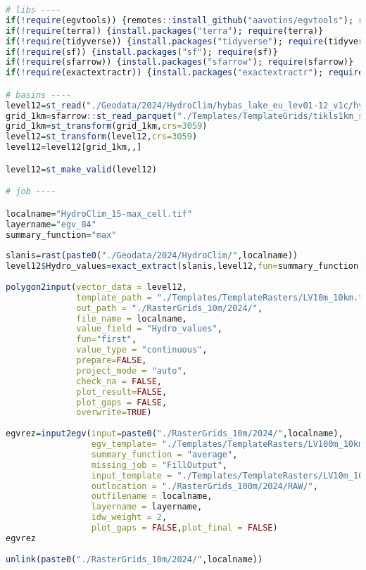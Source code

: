 \documentclass[
]{book}
\begin{document}
\begin{lstlisting}[language=R]
# libs ----
if(!require(egvtools)) {remotes::install_github("aavotins/egvtools"); require(egvtools)}
if(!require(terra)) {install.packages("terra"); require(terra)}
if(!require(tidyverse)) {install.packages("tidyverse"); require(tidyverse)}
if(!require(sf)) {install.packages("sf"); require(sf)}
if(!require(sfarrow)) {install.packages("sfarrow"); require(sfarrow)}
if(!require(exactextractr)) {install.packages("exactextractr"); require(exactextractr)}

# basins ----
level12=st_read("./Geodata/2024/HydroClim/hybas_lake_eu_lev01-12_v1c/hybas_lake_eu_lev12_v1c.shp")
grid_1km=sfarrow::st_read_parquet("./Templates/TemplateGrids/tikls1km_sauzeme.parquet")
grid_1km=st_transform(grid_1km,crs=3059)
level12=st_transform(level12,crs=3059)
level12=level12[grid_1km,,]

level12=st_make_valid(level12)

# job ----

localname="HydroClim_15-max_cell.tif"
layername="egv_84"
summary_function="max"
  
slanis=rast(paste0("./Geodata/2024/HydroClim/",localname))
level12$Hydro_values=exact_extract(slanis,level12,fun=summary_function)
  
polygon2input(vector_data = level12,
              template_path = "./Templates/TemplateRasters/LV10m_10km.tif",
              out_path = "./RasterGrids_10m/2024/",
              file_name = localname,
              value_field = "Hydro_values",
              fun="first",
              value_type = "continuous",
              prepare=FALSE,
              project_mode = "auto",
              check_na = FALSE,
              plot_result=FALSE,
              plot_gaps = FALSE,
              overwrite=TRUE)
  
egvrez=input2egv(input=paste0("./RasterGrids_10m/2024/",localname),
                 egv_template= "./Templates/TemplateRasters/LV100m_10km.tif",
                 summary_function = "average",
                 missing_job = "FillOutput",
                 input_template = "./Templates/TemplateRasters/LV10m_10km.tif",
                 outlocation = "./RasterGrids_100m/2024/RAW/",
                 outfilename = localname,
                 layername = layername,
                 idw_weight = 2,
                 plot_gaps = FALSE,plot_final = FALSE)
egvrez
  
unlink(paste0("./RasterGrids_10m/2024/",localname))
\end{lstlisting}
\end{document}
